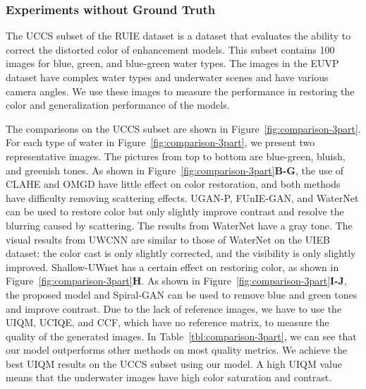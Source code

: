 \documentclass[utf8]{FrontiersinHarvard} %
\begin{document}
\subsubsection{Experiments without Ground Truth}
The UCCS subset of the RUIE dataset is a dataset that evaluates the ability to correct the distorted color of enhancement models. This subset contains 100 images for blue, green, and blue-green water types. The images in the EUVP dataset have complex water types and underwater scenes and have various camera angles. We use these images to measure the performance in restoring the color and generalization performance of the models. 

The comparisons on the UCCS subset are shown in Figure~\ref{fig:comparison-3part}. For each type of water in Figure~\ref{fig:comparison-3part}, we present two representative images. The pictures from top to bottom are blue-green, bluish, and greenish tones. As shown in Figure~\ref{fig:comparison-3part}\textbf{B-G}, the use of CLAHE and OMGD have little effect on color restoration, and both methods have difficulty removing scattering effects. UGAN-P, FUnIE-GAN, and WaterNet can be used to restore color but only slightly improve contrast and resolve the blurring caused by scattering. The results from WaterNet have a gray tone. The visual results from UWCNN are similar to those of WaterNet on the UIEB dataset: 
the color cast is only slightly corrected, and the visibility is only slightly improved.
 Shallow-UWnet has a certain effect on restoring color, as shown in Figure~\ref{fig:comparison-3part}\textbf{H}. As shown in Figure~\ref{fig:comparison-3part}\textbf{I-J}, the proposed model and Spiral-GAN can be used to remove blue and green tones and improve contrast. Due to the lack of reference images, {we have to use the UIQM, UCIQE, and CCF, which have no reference matrix, to measure the quality of the generated images. In Table~\ref{tbl:comparison-3part}, we can see that our model outperforms other methods on most quality metrics. We achieve the best UIQM results on the UCCS subset using our model. A high UIQM value means that the underwater images have high color saturation and contrast}.
\end{document}
